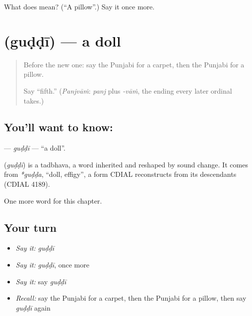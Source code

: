 \begin{tcolorbox}[breakable,colback=teal!4,colframe=teal!35!black,title={Before you move on}]
What does  mean? (\textquotedblleft{}A pillow\textquotedblright{}.) Say it once more.
\end{tcolorbox}
\section[\texorpdfstring{\pa{ਗੁੱਡੀ} (guḍḍī)}{ਗੁੱਡੀ (guḍḍī)}]{ (guḍḍī) — a doll}

\label{lesson:PA-C118-guddi}



\begin{quote}
Before the new one: say the Punjabi for a carpet, then the Punjabi for a pillow.

Say \textquotedblleft{}fifth.\textquotedblright{} (\emph{Panjvāṁ}: \emph{panj} plus \emph{-vāṁ}, the ending every later ordinal takes.)
\end{quote}

\subsection*{You'll want to know: }
\textbf{} — \emph{guḍḍī} — \textquotedblleft{}a doll\textquotedblright{}.

\begin{cousinweb}
\textbf{} (\emph{guḍḍī}) is a tadbhava, a word inherited and reshaped by sound change. It comes from \emph{*guḍḍa}, \textquotedblleft{}doll, effigy\textquotedblright{}, a form CDIAL reconstructs from its descendants (CDIAL 4189).
\end{cousinweb}

\begin{grammarlens}[title={What you've built}]
One more word for this chapter.
\end{grammarlens}

\subsection*{Your turn}
\begin{itemize}
\raggedright
  \item \emph{Say it:} \emph{guḍḍī}
  \item \emph{Say it:} \emph{guḍḍī}, once more
  \item \emph{Say it:} say \emph{guḍḍī}
  \item \emph{Recall:} say the Punjabi for a carpet, then the Punjabi for a pillow, then say \emph{guḍḍī} again
\end{itemize}


